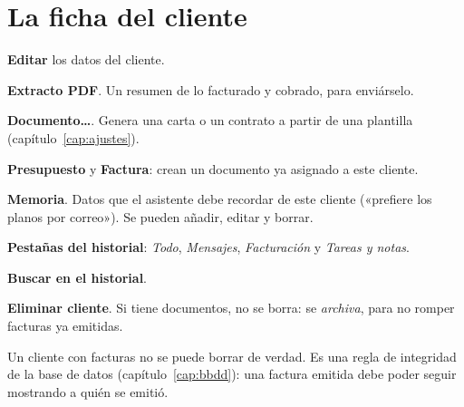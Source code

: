 \section{La ficha del cliente}
\begin{leyenda}
\item[\mk{1}] \textbf{Editar} los datos del cliente.
\item[\mk{2}] \textbf{Extracto PDF}. Un resumen de lo facturado y cobrado, para enviárselo.
\item[\mk{3}] \textbf{Documento…}. Genera una carta o un contrato a partir de una plantilla (capítulo~\ref{cap:ajustes}).
\item[\mk{4}] \textbf{Presupuesto} y  \textbf{Factura}: crean un documento ya asignado a este cliente.
\item[\mk{6}] \textbf{Memoria}. Datos que el asistente debe recordar de este cliente («prefiere los planos por correo»). Se pueden añadir, editar y borrar.
\item[\mk{7}] \textbf{Pestañas del historial}: \emph{Todo}, \emph{Mensajes}, \emph{Facturación} y \emph{Tareas y notas}.
\item[\mk{8}] \textbf{Buscar en el historial}.
\item[\mk{9}] \textbf{Eliminar cliente}. Si tiene documentos, no se borra: se \emph{archiva}, para no romper facturas ya emitidas.
\end{leyenda}

\begin{ideabox}
Un cliente con facturas no se puede borrar de verdad. Es una regla de integridad de la base de datos (capítulo~\ref{cap:bbdd}): una factura emitida debe poder seguir mostrando a quién se emitió.
\end{ideabox}
